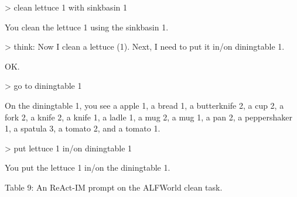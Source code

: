 \documentclass[
]{article}
\begin{document}
\textgreater{} clean lettuce 1 with sinkbasin 1

You clean the lettuce 1 using the sinkbasin 1.

\textgreater{} think: Now I clean a lettuce (1). Next, I need to put it
in/on diningtable 1.

OK.

\textgreater{} go to diningtable 1

On the diningtable 1, you see a apple 1, a bread 1, a butterknife 2, a
cup 2, a fork 2, a knife 2, a knife 1, a ladle 1, a mug 2, a mug 1, a
pan 2, a peppershaker 1, a spatula 3, a tomato 2, and a tomato 1.

\textgreater{} put lettuce 1 in/on diningtable 1

You put the lettuce 1 in/on the diningtable 1.

Table 9: An ReAct-IM prompt on the ALFWorld clean task.
\end{document}
